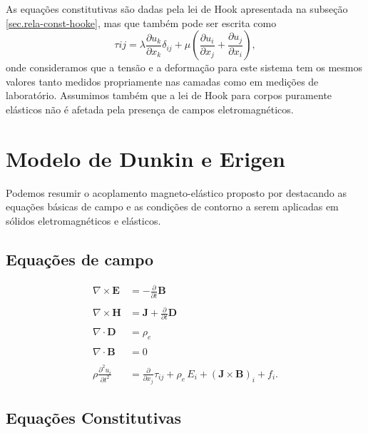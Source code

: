 As equa\c{c}\~oes constitutivas s\~ao dadas pela lei de Hook apresentada na subse\c{c}\~ao \ref{sec.rela-const-hooke}, mas que tamb\'em pode ser escrita como
\begin{equation}
\tau{ij}=\lambda\frac{\partial u_k}{\partial x_k}\delta_{ij}+\mu\left(\frac{\partial u_i}{\partial x_j}+\frac{\partial u_j}{\partial x_i}\right),
\end{equation}
onde consideramos que a tens\~ao e a deforma\c{c}\~ao para  este sistema tem os mesmos valores tanto medidos propriamente nas camadas como em medi\c{c}\~oes de laborat\'orio. Assumimos tamb\'em que a lei de Hook para corpos puramente el\'asticos n\~ao \'e afetada pela presen\c{c}a de campos eletromagn\'eticos. 


\section{Modelo de Dunkin e Erigen}

Podemos resumir o acoplamento magneto-el\'astico proposto por \cite{erigen_1963} destacando as equa\c{c}\~oes b\'asicas de campo e as condi\c{c}\~oes de contorno a serem aplicadas em s\'olidos eletromagn\'eticos e el\'asticos.

\subsection{Equa\c{c}\~oes de campo}

\begin{align}\label{eq.campo_dunkin_1}
\nabla\times\mathbf{E}&=-\frac{\partial}{\partial t}\mathbf{B}\\\nonumber\\\label{eq.campo_dunkin_2}
\nabla\times\mathbf{H}&=\mathbf{J}+\frac{\partial}{\partial t}\mathbf{D}\\\nonumber\\\label{eq.campo_dunkin_3}
\nabla\cdot\mathbf{D}&=\rho_e\\\nonumber\\
\nabla\cdot\mathbf{B}&=0\\\nonumber\\
\rho\frac{\partial^2 u_i}{\partial t^2}&=\frac{\partial}{\partial x_j}\tau_{ij}+\rho_e\,E_i+(\mathbf{J}\times\mathbf{B})_i+f_i.
\end{align}

\subsection{Equa\c{c}\~oes Constitutivas}\label{sec.constitutivas_dunkin}

